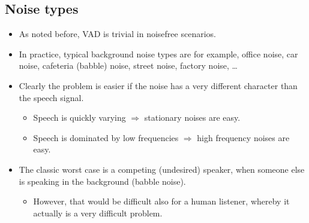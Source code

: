 \documentclass[letterpaper,10pt,english]{jupyterBook}
\begin{document}
\subsection{Noise types}
\label{\detokenize{Recognition/Voice_activity_detection:noise-types}}\begin{itemize}
\item {} 
\sphinxAtStartPar
As noted before, VAD is trivial in noise\sphinxhyphen{}free scenarios.

\item {} 
\sphinxAtStartPar
In practice, typical background noise types are for example, office
noise, car noise, cafeteria (babble) noise, street noise, factory
noise, …

\item {} 
\sphinxAtStartPar
Clearly the problem is easier if the noise has a very different
character than the speech signal.
\begin{itemize}
\item {} 
\sphinxAtStartPar
Speech is quickly varying \(\Rightarrow\) stationary noises are
easy.

\item {} 
\sphinxAtStartPar
Speech is dominated by low frequencies \(\Rightarrow\) high
frequency noises are easy.

\end{itemize}

\item {} 
\sphinxAtStartPar
The classic worst case is a competing (undesired) speaker, when
someone else is speaking in the background (babble noise).
\begin{itemize}
\item {} 
\sphinxAtStartPar
However, that would be difficult also for a human listener,
whereby it actually is a very difficult problem.

\end{itemize}

\end{itemize}
\end{document}
